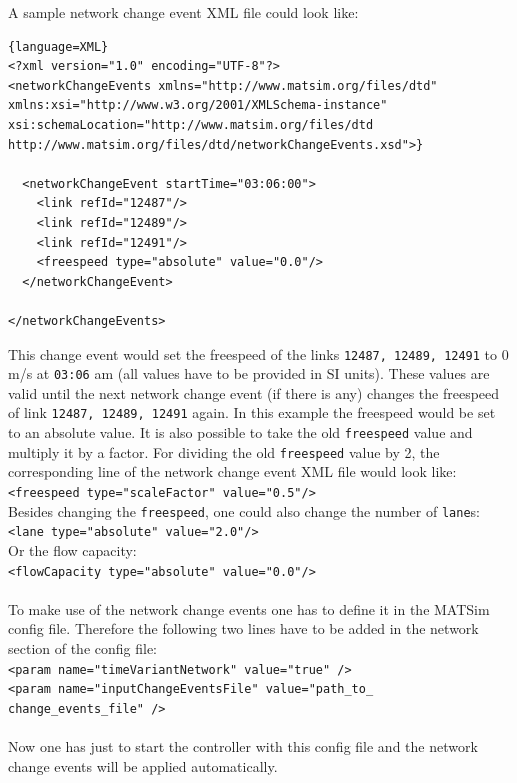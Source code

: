 A sample network change event XML file could look like:

\begin{lstlisting}{language=XML}
<?xml version="1.0" encoding="UTF-8"?>
<networkChangeEvents xmlns="http://www.matsim.org/files/dtd"  xmlns:xsi="http://www.w3.org/2001/XMLSchema-instance"  xsi:schemaLocation="http://www.matsim.org/files/dtd  http://www.matsim.org/files/dtd/networkChangeEvents.xsd">}

  <networkChangeEvent startTime="03:06:00">
    <link refId="12487"/>
    <link refId="12489"/>
    <link refId="12491"/>
    <freespeed type="absolute" value="0.0"/>
  </networkChangeEvent>

</networkChangeEvents>
\end{lstlisting}

This change event would set the freespeed of the links 
\texttt{12487, 12489, 12491} to 0 m/s at 
\texttt{03:06}  am (all values have to be provided in SI units). These values are valid  until the next network change event (if there is any) changes the  freespeed of link 
\texttt{12487, 12489, 12491} again. In this example the freespeed would be set to an absolute value. It is also possible to take the old 
\texttt{freespeed} value and multiply it by a factor. For dividing the old 
\texttt{freespeed} value by 2, the corresponding line of the network change event XML file would look like:
\\   
\texttt{<freespeed type="scaleFactor" value="0.5"/>}
\\  Besides changing the 
\texttt{freespeed}, one could also change the number of 
\texttt{lane}s:
\\   
\texttt{<lane type="absolute" value="2.0"/>}
\\  Or the flow capacity:
\\   
\texttt{<flowCapacity type="absolute" value="0.0"/>}
\\
\\  To make use of the network change events one has to define it in the  MATSim config file. Therefore the following two lines have to be added  in the network section of the config file:
\\
\texttt{<param name="timeVariantNetwork" value="true" />
\\  <param name="inputChangeEventsFile" value="path\_to\_ change\_events\_file" />}
\\
\\  Now one has just to start the controller with this config file and the network change events will be applied automatically.


